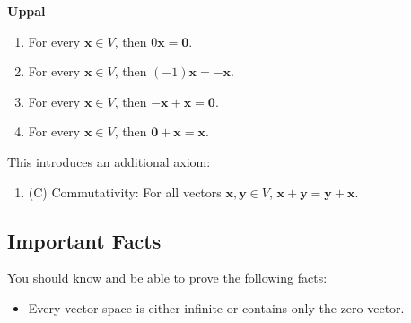 \documentclass{article}
\newcommand{\bff}[1]{\mathbf{#1}}
\begin{document}
    \hfill
    \begin{minipage}[t]{.45\textwidth}
        \begin{center}
            \textbf{Uppal}
        \end{center}
        \begin{enumerate}[label = \textbf{Prop \Roman*.}, leftmargin=16mm]
            \item For every $\bff{x} \in V$, then $0\bff{x}=\bff{0}$.
            \item For every $\bff{x} \in V$, then $(-1)\bff{x} = \bff{-x}$.
            \item For every $\bff{x} \in V$, then $\bff{-x}+\bff{x}=\bff{0}$.
            \item For every $\bff{x} \in V$, then $\bff{0}+\bff{x}=\bff{x}$.
        \end{enumerate}
        \vspace{2mm}
        This introduces an additional axiom:
        \vspace{2mm}

        \begin{enumerate}[label=10.]
            \item (C) Commutativity: For all vectors $\bff{x}, \bff{y} \in V$, $\bff{x}+\bff{y}=\bff{y}+\bff{x}$.
        \end{enumerate}
        \vfill
    \end{minipage}
    \subsection{Important Facts}
    You should know and be able to prove the following facts:
    \begin{itemize}
        \item Every vector space is either infinite or contains only the zero vector. 
    \end{itemize}
\end{document}
